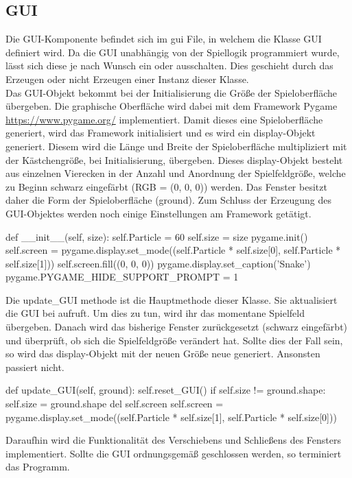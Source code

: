 \subsection{GUI} \label{sec:Implementierung_GUI}
Die GUI-Komponente befindet sich im gui File, in welchem die Klasse GUI definiert wird. Da die GUI unabhängig von der Spiellogik programmiert wurde, lässt sich diese je nach Wunsch ein oder ausschalten. Dies geschieht durch das Erzeugen oder nicht Erzeugen einer Instanz dieser Klasse.\\
Das GUI-Objekt bekommt bei der Initialisierung die Größe der Spieloberfläche übergeben. Die graphische Oberfläche wird dabei mit dem Framework Pygame \url{https://www.pygame.org/} implementiert. Damit dieses eine Spieloberfläche generiert, wird das Framework initialisiert und es wird ein display-Objekt generiert. Diesem wird die Länge und Breite der Spieloberfläche multipliziert mit der Kästchengröße, bei Initialisierung, übergeben. Dieses display-Objekt besteht aus einzelnen Vierecken in der Anzahl und Anordnung der Spielfeldgröße, welche zu Beginn schwarz eingefärbt (RGB = (0, 0, 0)) werden. Das Fenster besitzt daher die Form der Spieloberfläche (ground). Zum Schluss der Erzeugung des GUI-Objektes werden noch einige Einstellungen am Framework getätigt.
\begin{python}
	def __init__(self, size):
		self.Particle = 60
		self.size = size
		pygame.init()
		self.screen = pygame.display.set_mode((self.Particle * self.size[0], self.Particle * self.size[1]))
		self.screen.fill((0, 0, 0))
		pygame.display.set_caption('Snake')
		pygame.PYGAME_HIDE_SUPPORT_PROMPT = 1
\end{python}
Die update\_GUI methode ist die Hauptmethode dieser Klasse. Sie aktualisiert die GUI bei aufruft. Um dies zu tun, wird ihr das momentane Spielfeld übergeben. Danach wird das bisherige Fenster zurückgesetzt (schwarz eingefärbt) und überprüft, ob sich die Spielfeldgröße verändert hat. Sollte dies der Fall sein, so wird das display-Objekt mit der neuen Größe neue generiert. Ansonsten passiert nicht.
\begin{python}
	def update_GUI(self, ground):
		self.reset_GUI()
		if self.size != ground.shape:
			self.size = ground.shape
			del self.screen
			self.screen = pygame.display.set_mode((self.Particle * self.size[1], self.Particle * self.size[0]))
\end{python}
Daraufhin wird die Funktionalität des Verschiebens und Schließens des Fensters implementiert. Sollte die GUI ordnungsgemäß geschlossen werden, so terminiert das Programm.
